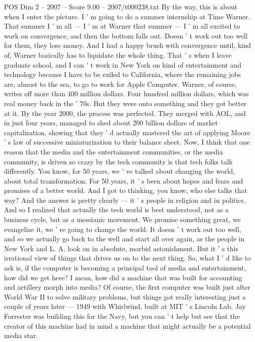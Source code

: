 \begin{textsample}{POS Dim 2 – 2007 – Score 9.00 – 2007/t000238.txt}
By the way, this is about when I enter the picture.
I ' m going to do a summer internship at Time Warner.
That summer I ' m all — I ' m at Warner that summer — I ' m all excited to work on convergence, and then the bottom falls out.
Doesn ' t work out too well for them, they lose money.
And I had a happy brush with convergence until, kind of, Warner basically has to liquidate the whole thing.
That ' s when I leave graduate school, and I can ' t work in New York on kind of entertainment and technology because I have to be exiled to California, where the remaining jobs are, almost to the sea, to go to work for Apple Computer.
Warner, of course, writes off more than 400 million dollars.
Four hundred million dollars, which was real money back in the ' 70s.
But they were onto something and they got better at it.
By the year 2000, the process was perfected.
They merged with AOL, and in just four years, managed to shed about 200 billion dollars of market capitalization, showing that they ' d actually mastered the art of applying Moore ' s law of successive miniaturization to their balance sheet.
Now, I think that one reason that the media and the entertainment communities, or the media community, is driven so crazy by the tech community is that tech folks talk differently.
You know, for 50 years, we ' ve talked about changing the world, about total transformation.
For 50 years, it ' s been about hopes and fears and promises of a better world.
And I got to thinking, you know, who else talks that way?
And the answer is pretty clearly — it ' s people in religion and in politics.
And so I realized that actually the tech world is best understood, not as a business cycle, but as a messianic movement.
We promise something great, we evangelize it, we ' re going to change the world.
It doesn ' t work out too well, and so we actually go back to the well and start all over again, as the people in New York and L.
A. look on in absolute, morbid astonishment.
But it ' s this irrational view of things that drives us on to the next thing.
So, what I ' d like to ask is, if the computer is becoming a principal tool of media and entertainment, how did we get here?
I mean, how did a machine that was built for accounting and artillery morph into media?
Of course, the first computer was built just after World War II to solve military problems, but things got really interesting just a couple of years later — 1949 with Whirlwind, built at MIT ' s Lincoln Lab.
Jay Forrester was building this for the Navy, but you can ' t help but see that the creator of this machine had in mind a machine that might actually be a potential media star.

\end{textsample}
